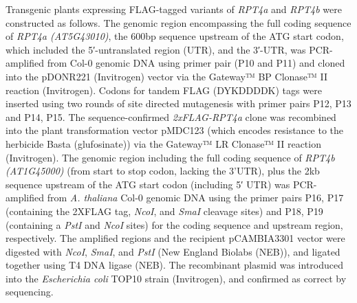 	Transgenic plants expressing FLAG-tagged variants of \textit{RPT4a} and \textit{RPT4b} were constructed as follows. The genomic region encompassing the full coding sequence of \textit{RPT4a (AT5G43010)}, the 600bp sequence upstream of the ATG start codon, which included the 5′-untranslated region (UTR), and the 3′-UTR, was PCR-amplified from Col-0 genomic DNA using primer pair (P10 and P11) and cloned into the pDONR221 (Invitrogen) vector via the Gateway™ BP Clonase™ II reaction (Invitrogen). Codons for tandem FLAG (DYKDDDDK) tags were inserted using two rounds of site directed mutagenesis \citep{edelheit09} with primer pairs P12, P13 and P14, P15. The sequence-confirmed \textit{2xFLAG-RPT4a} clone was recombined into the plant transformation vector pMDC123 (which encodes resistance to the herbicide Basta (glufosinate)) via the Gateway™ LR Clonase™ II reaction (Invitrogen). The genomic region including the full coding sequence of \textit{RPT4b (AT1G45000)} (from start to stop codon, lacking the 3’UTR), plus the 2kb sequence upstream of the ATG start codon (including 5′ UTR) was PCR-amplified from \textit{A. thaliana} Col-0 genomic DNA using the primer pairs P16, P17 (containing the 2XFLAG tag, \textit{NcoI}, and \textit{SmaI} cleavage sites) and P18, P19 (containing a \textit{PstI} and \textit{NcoI} sites) for the coding sequence and upstream region, respectively. The amplified regions and the recipient pCAMBIA3301 vector were digested with \textit{NcoI}, \textit{SmaI}, and \textit{PstI} (New England Biolabs (NEB)), and ligated together using T4 DNA ligase (NEB). The recombinant plasmid was introduced into the \textit{Escherichia coli} TOP10 strain (Invitrogen), and confirmed as correct by sequencing. 
	
